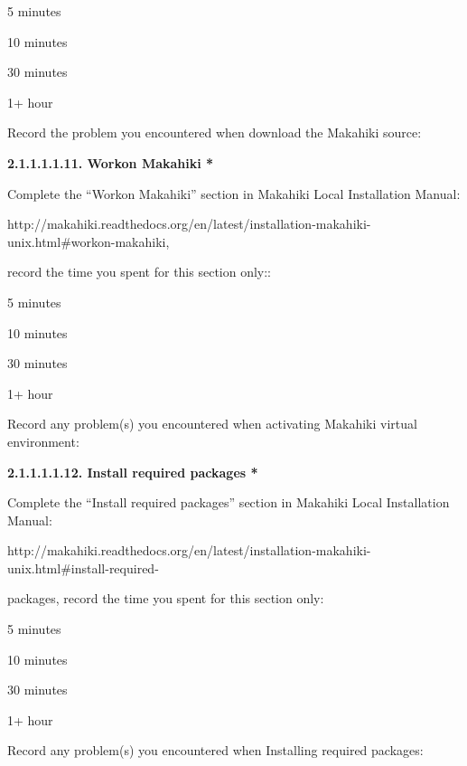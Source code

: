 \begin{radiobutton}
\item 5 minutes
\item  10 minutes
\item  30 minutes
\item  1+ hour
\end{radiobutton}

Record the problem you encountered when download the Makahiki source: \underline{\hspace{3cm}}

{\bf 2.1.1.1.1.11. Workon Makahiki *}

Complete the ``Workon Makahiki'' section in Makahiki Local Installation Manual:

http://makahiki.readthedocs.org/en/latest/installation-makahiki-unix.html\#workon-makahiki, 

record the time you spent for this section only::

\begin{radiobutton}
\item 5 minutes
\item  10 minutes
\item  30 minutes
\item  1+ hour
\end{radiobutton}

Record any problem(s) you encountered when activating Makahiki virtual environment: 

\underline{\hspace{4cm}}

{\bf 2.1.1.1.1.12. Install required packages *}

Complete the ``Install required packages'' section in Makahiki Local Installation Manual:

http://makahiki.readthedocs.org/en/latest/installation-makahiki-unix.html\#install-required-

packages,  record the time you spent for this section only:

\begin{radiobutton}
\item 5 minutes
\item  10 minutes
\item  30 minutes
\item  1+ hour
\end{radiobutton}

Record any problem(s) you encountered when Installing required packages: \underline{\hspace{3cm}}

